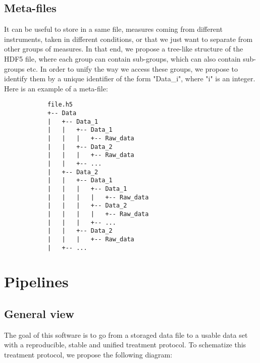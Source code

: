 \documentclass{article}
\begin{document}
    \subsection{Meta-files}
        It can be useful to store in a same file, measures coming from different instruments, taken in different conditions, or that we just want to separate from other groups of measures. In that end, we propose a tree-like structure of the HDF5 file, where each group can contain sub-groups, which can also contain sub-groups etc. In order to unify the way we access these groups, we propose to identify them by a unique identifier of the form "Data\_i", where "i" is an integer. Here is an example of a meta-file:

        \begin{verbatim}
            file.h5
            +-- Data
            |   +-- Data_1
            |   |   +-- Data_1
            |   |   |   +-- Raw_data
            |   |   +-- Data_2
            |   |   |   +-- Raw_data
            |   |   +-- ...
            |   +-- Data_2
            |   |   +-- Data_1
            |   |   |   +-- Data_1
            |   |   |   |   +-- Raw_data
            |   |   |   +-- Data_2
            |   |   |   |   +-- Raw_data
            |   |   |   +-- ...
            |   |   +-- Data_2
            |   |   |   +-- Raw_data
            |   +-- ...
        \end{verbatim}

\section{Pipelines}
   
    \subsection{General view} 

        The goal of this software is to go from a storaged data file to a usable data set with a reproducible, stable and unified treatment protocol. To schematize this treatment protocol, we propose the following diagram:
\end{document}
